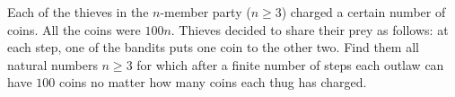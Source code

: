Each of the thieves in the $n$-member party ($n \ge 3$) charged a certain number of coins. All the coins were $100n$. Thieves decided to share their prey as follows: at each step, one of the bandits puts one coin to the other two. Find them all natural numbers $n \ge 3$ for which after a finite number of steps each outlaw can have $100$ coins no matter how many coins each thug has charged.